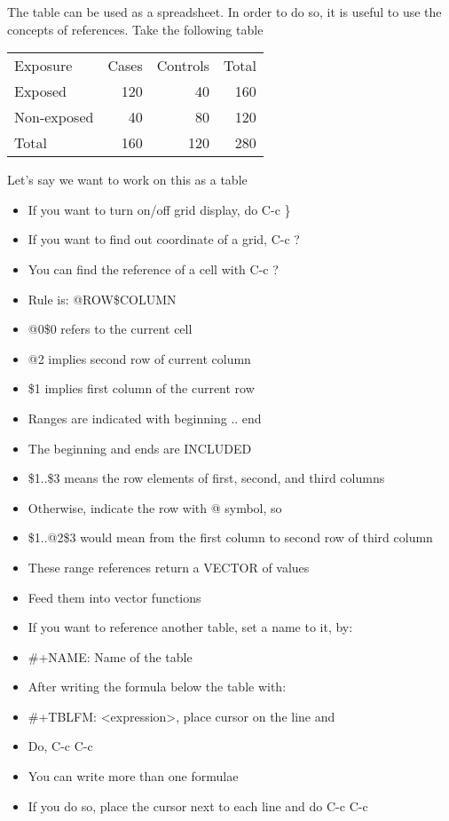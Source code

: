 \documentclass[11pt]{article}
\begin{document}
The table can be used as a spreadsheet. In order to do so, it is useful to use the concepts of references. Take the following table

\begin{center}
\begin{tabular}{lrrr}
Exposure & Cases & Controls & Total\\
Exposed & 120 & 40 & 160\\
Non-exposed & 40 & 80 & 120\\
Total & 160 & 120 & 280\\
\end{tabular}
\end{center}

Let's say we want to work on this as a table

\begin{itemize}
\item If you want to turn on/off grid display, do C-c \}
\item If you want to find out coordinate of a grid, C-c ?
\item You can find the reference of a cell with C-c ?
\item Rule is: @ROW\$COLUMN
\item @0\$0 refers to the current cell
\item @2 implies second row of current column
\item \$1 implies first column of the current row
\item Ranges are indicated with beginning .. end
\item The beginning and ends are INCLUDED
\item \$1..\$3 means the row elements of first, second, and third columns
\item Otherwise, indicate the row with @ symbol, so
\item \$1..@2\$3 would mean from the first column to second row of third column
\item These range references return a VECTOR of values
\item Feed them into vector functions
\item If you want to reference another table, set a name to it, by:
\item \#+NAME: Name of the table
\item After writing the formula below the table with:
\item \#+TBLFM: <expression>, place cursor on the line and
\item Do, C-c C-c
\item You can write more than one formulae
\item If you do so, place the cursor next to each line and do C-c C-c
\end{itemize}
\end{document}

